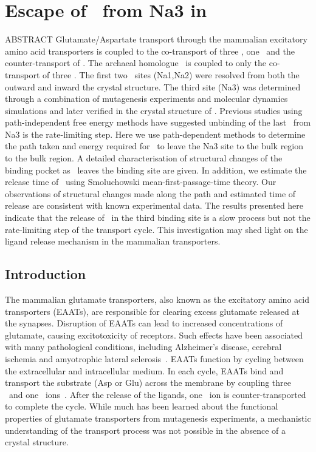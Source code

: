 \chapter{Escape of \Na\ from Na3 in \GltPh}
\label{chap:unbind}
ABSTRACT \newline
Glutamate/Aspartate transport through the mammalian excitatory amino acid transporters 
is coupled to the co-transport of three \Na, one \Hi\ and the counter-transport of \K. 
The archaeal homologue \GltPh\ is coupled to only the co-transport of three \Na. The 
first two \Na\ sites (Na1,Na2) were resolved from both the outward and inward the crystal 
structure. The third site (Na3) was determined through a combination of mutagenesis 
experiments and molecular dynamics simulations and later verified in the crystal structure 
of \GltTk. Previous studies using path-independent free energy methods have suggested 
unbinding of the last \Na\ from Na3 is the rate-limiting step. Here we use path-dependent 
methods to determine the path taken and energy required for \Na\ to leave the Na3 site to 
the bulk region to the bulk region. A detailed characterisation of structural changes of 
the binding pocket as \Na\ leaves the binding site are given. In addition, we estimate the 
release time of \Na\ using Smoluchowski mean-first-passage-time theory. Our observations 
of structural changes made along the path and estimated time of release are consistent 
with known experimental data. The results presented here indicate that the release of 
\Na\ in the third binding site is a slow process but not the rate-limiting step of the 
transport cycle. This investigation may shed light on the ligand release mechanism in 
the mammalian transporters.

\newpage
\section{Introduction}
The mammalian glutamate transporters, also known as the excitatory amino acid transporters 
(EAATs), are responsible for clearing excess glutamate released at the synapses. Disruption 
of EAATs can lead to increased concentrations of glutamate, causing excitotoxicity of receptors. 
Such effects have been associated with many pathological conditions, including Alzheimer's 
disease, cerebral ischemia and amyotrophic lateral sclerosis~\cite{Danbolt2001}. EAATs 
function by cycling between the extracellular and intracellular medium. In each cycle, EAATs 
bind and transport the substrate (Asp or Glu) across the membrane by coupling three \Na\ and 
one \Hi\ ions~\cite{Zerangue1996}. After the release of the ligands, one \K\ ion is 
counter-transported to complete the cycle. While much has been learned about the functional 
properties of glutamate transporters from mutagenesis experiments, a mechanistic understanding 
of the transport process was not possible in the absence of a crystal structure. 

